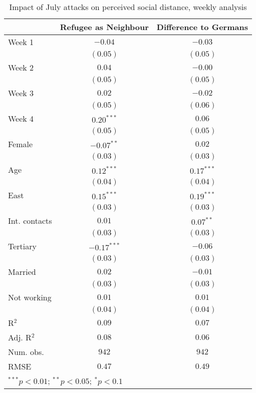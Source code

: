 
\begin{table}
\caption{Impact of July attacks on perceived social distance, weekly analysis}
\begin{center}
\begin{tabular}{l c c}
\toprule
 & Refugee as Neighbour & Difference to Germans \\
\midrule
Week 1        & $-0.04$       & $-0.03$      \\
              & $(0.05)$      & $(0.05)$     \\
Week 2        & $0.04$        & $-0.00$      \\
              & $(0.05)$      & $(0.05)$     \\
Week 3        & $0.02$        & $-0.02$      \\
              & $(0.05)$      & $(0.06)$     \\
Week 4        & $0.20^{***}$  & $0.06$       \\
              & $(0.05)$      & $(0.05)$     \\
Female        & $-0.07^{**}$  & $0.02$       \\
              & $(0.03)$      & $(0.03)$     \\
Age           & $0.12^{***}$  & $0.17^{***}$ \\
              & $(0.04)$      & $(0.04)$     \\
East          & $0.15^{***}$  & $0.19^{***}$ \\
              & $(0.03)$      & $(0.03)$     \\
Int. contacts & $0.01$        & $0.07^{**}$  \\
              & $(0.03)$      & $(0.03)$     \\
Tertiary      & $-0.17^{***}$ & $-0.06$      \\
              & $(0.03)$      & $(0.03)$     \\
Married       & $0.02$        & $-0.01$      \\
              & $(0.03)$      & $(0.03)$     \\
Not working   & $0.01$        & $0.01$       \\
              & $(0.04)$      & $(0.04)$     \\
\midrule
R$^2$         & $0.09$        & $0.07$       \\
Adj. R$^2$    & $0.08$        & $0.06$       \\
Num. obs.     & $942$         & $942$        \\
RMSE          & $0.47$        & $0.49$       \\
\bottomrule
\multicolumn{3}{l}{\scriptsize{$^{***}p<0.01$; $^{**}p<0.05$; $^{*}p<0.1$}}
\end{tabular}
\label{tab_dist_week}
\end{center}
\end{table}
